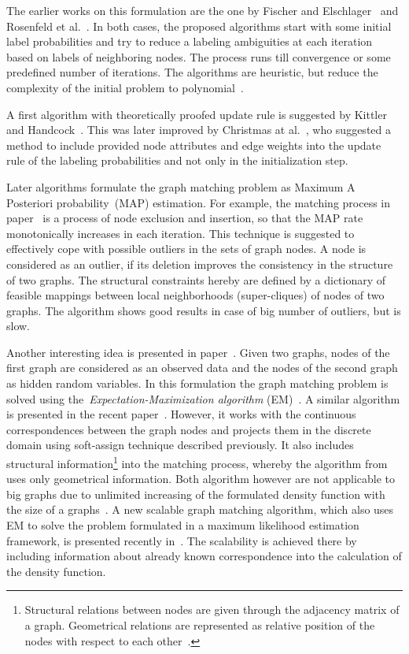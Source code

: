 The earlier works on this formulation are the one by Fischer and Elschlager~\cite{Fischler1973} and Rosenfeld et al.~\cite{Rosenfeld1976}. In both cases, the proposed algorithms start with some initial label probabilities and try to reduce a labeling ambiguities at each iteration based on labels of neighboring nodes. The process runs till convergence or some predefined number of iterations. The algorithms are heuristic, but reduce the complexity of the initial problem to polynomial~\cite{Christmas1995}.

A first algorithm with theoretically proofed update rule is suggested by Kittler and Handcock~\cite{Hancock_Kittler}. This was later improved by Christmas at al.~\cite{Christmas1995}, who suggested a method to include provided node attributes and edge weights into the update rule of the labeling probabilities and not only in the initialization step.

Later algorithms formulate the graph matching problem as Maximum A Posteriori probability~(MAP) estimation. For example, the matching process in paper~\cite{Hancock_StrucMatch} is a process of node exclusion and insertion, so that the MAP rate monotonically increases in each iteration. This technique is suggested to effectively cope with possible outliers in the sets of graph nodes. A node is considered as an outlier, if its deletion improves the consistency in the structure of two graphs. The structural constraints hereby are defined by a dictionary of feasible mappings between local neighborhoods (super-cliques) of nodes of two graphs. The algorithm shows good results in case of big number of outliers, but is slow.

Another interesting idea is presented in paper~\cite{Hancock_EM_SVD}. Given two graphs, nodes of the first graph are considered as an observed data and the nodes of the second graph as hidden random variables. In this formulation the graph matching problem is solved using the~\emph{Expectation-Maximization algorithm} (EM)~\cite{EM_Dempster1977}. A similar algorithm is presented in the recent paper~\cite{Sanrom2012}. However, it works with the continuous correspondences between the graph nodes and projects them in the discrete domain using soft-assign technique described previously. It also includes structural information\footnote{Structural relations between nodes are given through the adjacency matrix of a graph. Geometrical relations are represented as relative position of the nodes with respect to each other~\cite{Sanrom2012}.} into the matching process, whereby the algorithm from~\cite{Hancock_EM_SVD} uses only geometrical information. Both algorithm however are not applicable to big graphs due to unlimited increasing of the formulated density function with the size of a graphs~\cite{Armiti2014}. A new scalable graph matching algorithm, which also uses EM to solve the problem formulated in a maximum likelihood estimation framework, is presented recently in~\cite{Armiti2014}. The scalability is achieved there by including information about already known correspondence into the calculation of the density function.
